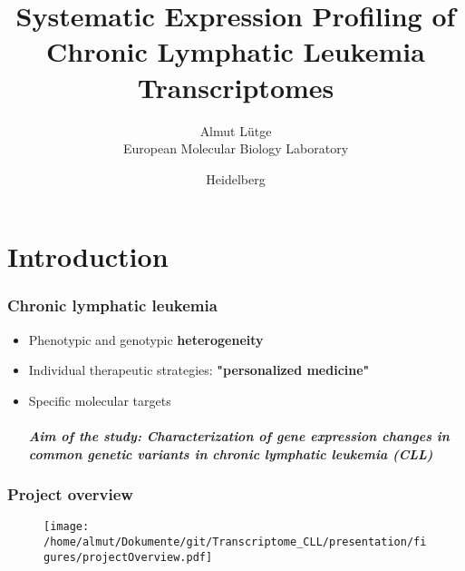 \documentclass[xcolor=dvipsnames,t,10pt]{beamer}
\title[Expression profiling CLL]{Systematic Expression Profiling of Chronic Lymphatic Leukemia Transcriptomes}
\author[Almut Lütge - European Molecular Biology Laboratory]{Almut Lütge\\European Molecular Biology Laboratory}
\date{Heidelberg \\ \bigskip {\monthyeardate{\today}}}
\begin{document}
\begin{frame}
  \titlepage
\end{frame}

%
%
%
%
\section{Introduction}
%
\begin{frame}[c]
	\frametitle{Chronic lymphatic leukemia}
	\begin{itemize}
	\item Phenotypic and genotypic \textbf{heterogeneity} 
	\item Individual therapeutic strategies: \textbf{"personalized medicine"}
	\item Specific molecular targets 
	\\~\\
	\textbf{\textit{Aim of the study: Characterization of gene expression changes in common genetic variants in chronic lymphatic leukemia  (CLL)}}
	\end{itemize}
\end{frame}
%
%
\begin{frame}[c]
\frametitle{Project overview}
\begin{figure}
\centering
\texttt{[image: /home/almut/Dokumente/git/Transcriptome\_CLL/presentation/figures/projectOverview.pdf]}
\end{figure}
\end{frame}
\end{document}
